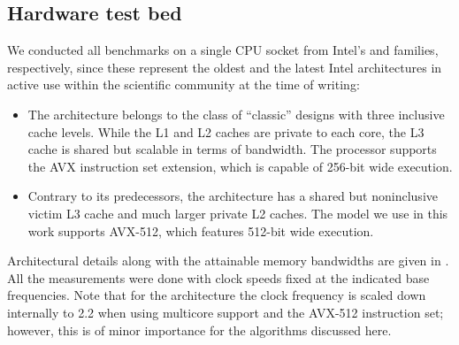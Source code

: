 \subsection{Hardware test bed}
We conducted all benchmarks on a single CPU socket from Intel's \IVB and  \SKX families, respectively, since these  represent the oldest and the latest Intel architectures in active use within the scientific community at the time of writing:
\begin{itemize}
\item The \Intel \IVB architecture belongs to the class of ``classic'' designs with three inclusive cache levels. While the L1 and L2 caches are private to each core, the L3 cache is shared but scalable in terms of bandwidth. The processor supports the AVX instruction set extension, which is capable of 256-bit wide \SIMD execution.
\item Contrary to its predecessors, the \Intel \SKX architecture has a shared but noninclusive victim L3 cache and much larger private L2 caches. The model we use in this work supports AVX-512, which features 512-bit wide \SIMD execution.
 
\end{itemize}
Architectural details along with the attainable memory bandwidths are given in . 
All the measurements were done with \CPU clock speeds fixed at the indicated base frequencies. Note that for the \SKX architecture the clock frequency is scaled down internally to 2.2 \GHZ when using multicore support and the AVX-512 instruction set; however, this is of minor importance for the algorithms discussed here.
